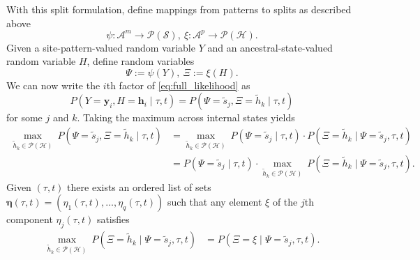 \documentclass[a4paper]{article}
\newcommand{\alphabet}{\mathcal{A}}
\newcommand{\alignmentColumn}{\mathbf{y}}
\newcommand{\alignmentColumnRV}{Y}
\newcommand{\siteSplit}{\tilde{s}}
\newcommand{\siteSplitSet}{\mathcal{S}}
\newcommand{\ancestralStateColumn}{\mathbf{h}}
\newcommand{\ancestralStateColumnRV}{H}
\newcommand{\ancestralSplit}{\tilde{h}}
\newcommand{\ancestralSplitSet}{\mathcal{H}}
\newcommand{\ancestralSplitPartition}{\eta}
\newcommand{\fullAncestralSplitPartitions}{\boldsymbol\eta}
\newcommand{\patternToSplit}{\psi}
\newcommand{\ancestralToSplit}{\xi}
\newcommand{\siteSplitRV}{\Psi}
\newcommand{\ancestralSplitRV}{\Xi}
\newcommand{\nSiteRows}{m}
\newcommand{\nAncestralStateRows}{p}
\newcommand{\nSiteSplits}{q}
\begin{document}
With this split formulation, define mappings from patterns to splits as described above
$$
\patternToSplit:\alphabet^\nSiteRows\rightarrow\mathcal{P}(\siteSplitSet), \ \ancestralToSplit:\alphabet^\nAncestralStateRows\rightarrow\mathcal{P}(\ancestralSplitSet).
$$
Given a site-pattern-valued random variable $\alignmentColumnRV$ and an ancestral-state-valued random variable $\ancestralStateColumnRV$, define random variables
$$
\siteSplitRV := \patternToSplit(\alignmentColumnRV), \ \ancestralSplitRV := \ancestralToSplit(\ancestralStateColumnRV).
$$
We can now write the $i$th factor of \eqref{eq:full_likelihood} as
$$
P(\alignmentColumnRV=\alignmentColumn_i, \ancestralStateColumnRV=\ancestralStateColumn_i \mid \tau, t)=P(\siteSplitRV=\siteSplit_j, \ancestralSplitRV=\ancestralSplit_k \mid \tau, t)
$$
for some $j$ and $k$.
Taking the maximum across internal states yields
\begin{align*}
\max_{\ancestralSplit_k\in\mathcal{P}(\ancestralSplitSet)} \ P(\siteSplitRV=\siteSplit_j, \ancestralSplitRV=\ancestralSplit_k \mid \tau, t) &=
\max_{\ancestralSplit_k\in\mathcal{P}(\ancestralSplitSet)} \ P(\siteSplitRV=\siteSplit_j \mid  \tau, t)\cdot P(\ancestralSplitRV=\ancestralSplit_k  \mid \siteSplitRV=\siteSplit_j, \tau, t) \\
&= P(\siteSplitRV=\siteSplit_j \mid  \tau, t)\cdot\max_{\ancestralSplit_k\in\mathcal{P}(\ancestralSplitSet)} \ P(\ancestralSplitRV=\ancestralSplit_k  \mid \siteSplitRV=\siteSplit_j, \tau, t).
\end{align*}
Given $(\tau, t)$ there exists an ordered list of sets $\fullAncestralSplitPartitions(\tau, t)=(\ancestralSplitPartition_1(\tau, t),\ldots,\ancestralSplitPartition_\nSiteSplits(\tau, t))$ such that any element $\xi$ of the $j$th component $\ancestralSplitPartition_j(\tau, t)$ satisfies
\begin{align*}
\max_{\ancestralSplit_k\in\mathcal{P}(\ancestralSplitSet)} \ P(\ancestralSplitRV=\ancestralSplit_k \mid \siteSplitRV=\siteSplit_j, \tau, t) &= P(\ancestralSplitRV = \xi \mid \siteSplitRV=\siteSplit_j, \tau, t).
\end{align*}
\end{document}
